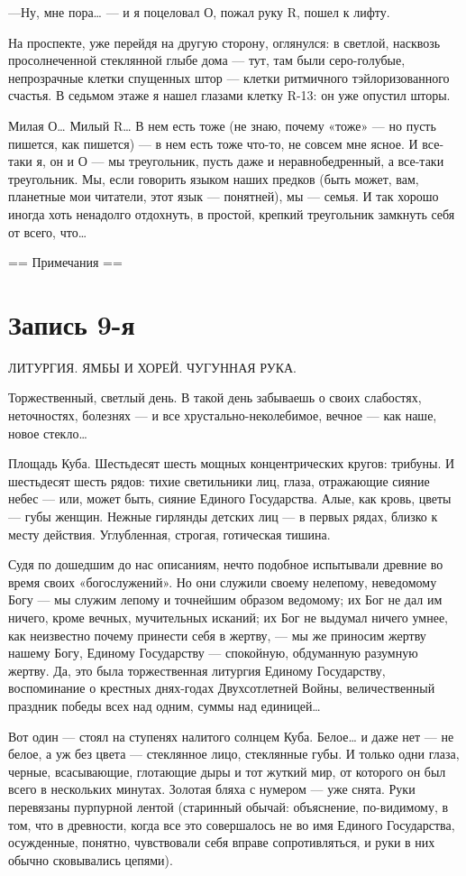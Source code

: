 \documentclass[11pt,openany]{book}
\newcommand{\bookchapterplain}[1]{%
  \clearpage\phantomsection\chapter*{#1}%
  \addcontentsline{toc}{chapter}{#1}\markboth{#1}{#1}\thispagestyle{plain}}
\begin{document}
---Ну, мне пора\ldots{} --- и я поцеловал О, пожал руку R, пошел к лифту.

На проспекте, уже перейдя на другую сторону, оглянулся: в светлой, насквозь просолнеченной стеклянной глыбе дома --- тут, там были серо-голубые, непрозрачные клетки спущенных штор --- клетки ритмичного тэйлоризованного счастья. В седьмом этаже я нашел глазами клетку R-13: он уже опустил шторы.

Милая О\ldots{} Милый R\ldots{} В нем есть тоже (не знаю, почему «тоже» --- но пусть пишется, как пишется) --- в нем есть тоже что-то, не совсем мне ясное. И все-таки я, он и О --- мы треугольник, пусть даже и неравнобедренный, а все-таки треугольник. Мы, если говорить языком наших предков (быть может, вам, планетные мои читатели, этот язык --- понятней), мы --- семья. И так хорошо иногда хоть ненадолго отдохнуть, в простой, крепкий треугольник замкнуть себя от всего, что\ldots{}

== Примечания ==

\bookchapterplain{Запись 9-я}

\begin{center}\textsc{ЛИТУРГИЯ. ЯМБЫ И ХОРЕЙ. ЧУГУННАЯ РУКА.}\end{center}

Торжественный, светлый день. В такой день забываешь о своих слабостях, неточностях, болезнях --- и все хрустально-неколебимое, вечное --- как наше, новое стекло\ldots{}

Площадь Куба. Шестьдесят шесть мощных концентрических кругов: трибуны. И шестьдесят шесть рядов: тихие светильники лиц, глаза, отражающие сияние небес --- или, может быть, сияние Единого Государства. Алые, как кровь, цветы --- губы женщин. Нежные гирлянды детских лиц --- в первых рядах, близко к месту действия. Углубленная, строгая, готическая тишина.

Судя по дошедшим до нас описаниям, нечто подобное испытывали древние во время своих «богослужений». Но они служили своему нелепому, неведомому Богу --- мы служим лепому и точнейшим образом ведомому; их Бог не дал им ничего, кроме вечных, мучительных исканий; их Бог не выдумал ничего умнее, как неизвестно почему принести себя в жертву, --- мы же приносим жертву нашему Богу, Единому Государству --- спокойную, обдуманную разумную жертву. Да, это была торжественная литургия Единому Государству, воспоминание о крестных днях-годах Двухсотлетней Войны, величественный праздник победы всех над одним, суммы над единицей\ldots{}

Вот один --- стоял на ступенях налитого солнцем Куба. Белое\ldots{} и даже нет --- не белое, а уж без цвета --- стеклянное лицо, стеклянные губы. И только одни глаза, черные, всасывающие, глотающие дыры и тот жуткий мир, от которого он был всего в нескольких минутах. Золотая бляха с нумером --- уже снята. Руки перевязаны пурпурной лентой (старинный обычай: объяснение, по-видимому, в том, что в древности, когда все это совершалось не во имя Единого Государства, осужденные, понятно, чувствовали себя вправе сопротивляться, и руки в них обычно сковывались цепями).
\end{document}

